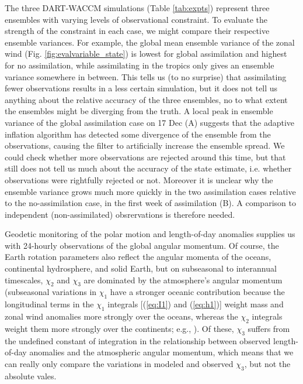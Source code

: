 The three DART-WACCM simulations (Table \ref{tab:expts}) represent three ensembles with varying levels of observational constraint. 
To evaluate the strength of the constraint in each case, we might compare their respective ensemble variances. 
For example, the global mean ensemble variance of the zonal wind (Fig. \ref{fig:evalvariable_state}) 
is lowest for global assimilation and highest for no assimilation, while assimilating in the tropics only gives an ensemble variance somewhere in between.
This tells us (to no surprise) that assimilating fewer observations results in a less certain simulation, but it 
does not tell us anything about the relative accuracy of the three ensembles, no to what extent the ensembles might be diverging from the truth. 
A local peak in ensemble variance of the global assimilation case on 17 Dec (A) suggests that the adaptive inflation algorithm has detected some divergence of the ensemble from the observations, causing the filter to artificially increase the ensemble spread. 
We could check whether more observations are rejected around this time, but that still does not tell us much about the accuracy of the state estimate, i.e. whether observations were rightfully rejected or not. 
Moreover it is unclear why the ensemble variance grows much more quickly in the two assimilation cases relative to the no-assimilation case, in the first week of assimilation (B).   
A comparison to independent (non-assimilated) obsrervations is therefore needed. 

Geodetic monitoring of the polar motion and length-of-day anomalies
supplies us with 24-hourly observations of the global
angular momentum.
Of course, the Earth rotation parameters also reflect the angular momenta of the oceans, continental hydrosphere, and solid Earth, but on subseasonal to interannual timescales, $\chi_2$ and $\chi_3$ are dominated by the atmosphere's angular momentum 
(subseasonal variations in $\chi_1$ have a stronger oceanic contribution 
because the 
longitudinal terms in the $\chi_1$ integrals [(\ref{eq:I1}) and (\ref{eq:h1})] weight mass and zonal wind anomalies more strongly over the oceans, whereas the $\chi_2$ integrals weight them more strongly over the continents; e.g., \citet{Neef2012}).
Of these, $\chi_3$ 
suffers from the undefined constant of integration in the relationship between observed length-of-day anomalies and the atmospheric angular momentum, which means that
we can really only compare the variations in modeled and observed $\chi_3$, but not the absolute vales. 

